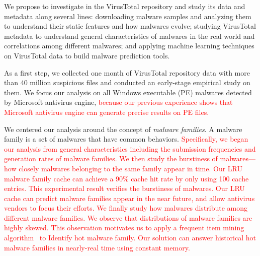 We propose to investigate in the VirusTotal repository 
and study its data and metadata along several lines: 
downloading malware samples and analyzing them to understand their static features and how malwares evolve; 
studying VirusTotal metadata %
to understand general characteristics of malwares in the real world and correlations among different malwares; 
and applying machine learning techniques on VirusTotal data to build malware prediction tools.

As a first step, we collected one month of VirusTotal repository data with more than 40 million suspicious files
and conducted an early-stage empirical study on them. 
We focus our analysis on all Windows executable (PE) malwares detected by Microsoft
antivirus engine, 
\textcolor{red}{because our previous experience shows that Microsoft antivirus engine can generate precise results on PE files.}

We centered our analysis around the concept of {\em malware families}.
A malware family is a set of malwares that have common behaviors.
\textcolor{red}{Specifically, we began our analysis from general characteristics including the submission
frequencies and generation rates of malware families. 
We then study the burstiness of malwares---how closely malwares belonging to the same family appear in time. 
Our LRU malware family cache can achieve a 90\% cache hit rate by only using 100 cache entries. This experimental result verifies the burstiness of malwares. 
Our LRU cache can predict malware families appear in the near future, and allow antivirus vendors to focus their efforts. 
We finally study how malwares distribute among different malware families. 
We observe that distributions of malware families are highly skewed. 
This observation motivates us to apply a frequent item mining algorithm~\cite{space-saving} to 
Identify hot malware family. Our solution can answer historical hot malware families in nearly-real time using constant memory. }


